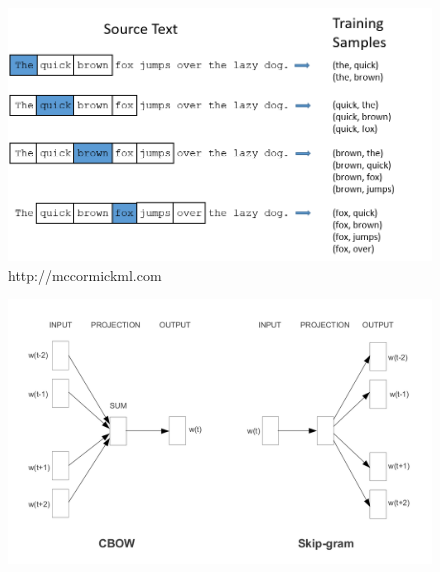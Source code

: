 \documentclass{beamer}
\begin{document}
\begin{frame}
	\begin{figure}[H]
		\centering
		\includegraphics[width=1\textwidth]{img/w2v_training_data.png}
		\captionsetup{labelformat=empty}
		\caption{http://mccormickml.com}
	\end{figure}
\end{frame}

\begin{frame}	
	
		\begin{figure}[H]
			\centering
			\includegraphics[width=1\textwidth]{img/skipgram_cbow.png}
		\end{figure}
	\end{frame}
	
\end{document}
